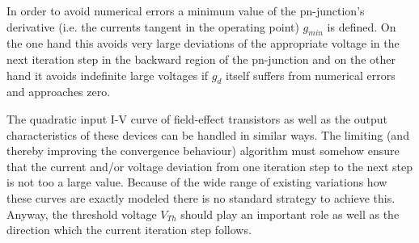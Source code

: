 In order to avoid numerical errors a minimum value of the
pn-junction's derivative (i.e. the currents tangent in the operating
point) $g_{min}$ is defined.  On the one hand this avoids very large
deviations of the appropriate voltage in the next iteration step in
the backward region of the pn-junction and on the other hand it avoids
indefinite large voltages if $g_d$ itself suffers from numerical
errors and approaches zero.

\addvspace{12pt}

The quadratic input I-V curve of field-effect transistors as well as
the output characteristics of these devices can be handled in similar
ways.  The limiting (and thereby improving the convergence behaviour)
algorithm must somehow ensure that the current and/or voltage
deviation from one iteration step to the next step is not too a large
value.  Because of the wide range of existing variations how these
curves are exactly modeled there is no standard strategy to achieve
this.  Anyway, the threshold voltage $V_{Th}$ should play an important
role as well as the direction which the current iteration step
follows.
